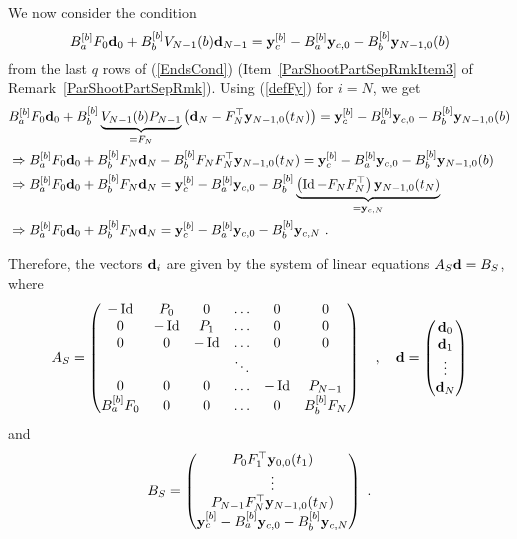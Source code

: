 We now consider the condition
\[
B_a^{[b]} F_0 \mathbf{d}_0 +B_b^{[b]} V_{N-1}(b) \mathbf{d}_{N-1}
= \mathbf{y}_c^{[b]} - B_a^{[b]} \mathbf{y}_{c,0} - B_b^{[b]} \mathbf{y}_{N-1,0}(b) 
\]
from the last $q$ rows of (\ref{EndsCond})
(Item~\ref{ParShootPartSepRmkItem3} of
Remark~\ref{ParShootPartSepRmk}).  Using (\ref{defFy}) for $i=N$, we
get
\begin{align*}
&B_a^{[b]} F_0 \mathbf{d}_0 +B_b^{[b]} \underbrace{V_{N-1}(b) P_{N-1}}_{=F_N} \left(
\mathbf{d}_N - F_N^\top\mathbf{y}_{N-1,0}(t_N)\right)
= \mathbf{y}_c^{[b]} - B_a^{[b]} \mathbf{y}_{c,0} - B_b^{[b]} \mathbf{y}_{N-1,0}(b) \\
&\Rightarrow
B_a^{[b]} F_0 \mathbf{d}_0 +B_b^{[b]} F_N \mathbf{d}_N
- B_b^{[b]} F_NF_N^\top \mathbf{y}_{N-1,0}(t_N)
= \mathbf{y}_c^{[b]} - B_a^{[b]} \mathbf{y}_{c,0} - B_b^{[b]} \mathbf{y}_{N-1,0}(b) \\
&\Rightarrow
B_a^{[b]} F_0 \mathbf{d}_0 +B_b^{[b]} F_N \mathbf{d}_N
= \mathbf{y}_c^{[b]} - B_a^{[b]} \mathbf{y}_{c,0} - B_b^{[b]}
\underbrace{\left( \operatorname{Id} - F_NF_N^\top \right)
\mathbf{y}_{N-1,0}(t_N)}_{= \mathbf{y}_{c,N}}  \\
&\Rightarrow
B_a^{[b]} F_0\mathbf{d}_0 + B_b^{[b]} F_N \mathbf{d}_N = \mathbf{y}_c^{[b]} -
B_a^{[b]} \mathbf{y}_{c,0} - B_b^{[b]} \mathbf{y}_{c,N}  \ .
\end{align*}

Therefore, the vectors $\mathbf{d}_i$ are given by the system of linear
equations $A_S \mathbf{d} = B_S$, where
\[
A_S = \begin{pmatrix}
-\operatorname{Id} & P_0 & 0 & \ldots & 0 & 0 \\
0 & -\operatorname{Id} & P_1 & \ldots & 0 & 0 \\
0 & 0 & -\operatorname{Id} & \ldots & 0 & 0 \\
 & & & \ddots & & \\
0 & 0 & 0 & \ldots & -\operatorname{Id} & P_{N-1} \\
B_a^{[b]} F_0 & 0 & 0 & \ldots & 0 & B_b^{[b]} F_N
\end{pmatrix}
\quad , \quad
\mathbf{d} = \begin{pmatrix} \mathbf{d}_0 \\ \mathbf{d}_1 \\ \vdots \\
\mathbf{d}_N \end{pmatrix}
\]
and
\[
B_S = \begin{pmatrix}
P_0 F_1^\top \mathbf{y}_{0,0}(t_1) \\
\vdots \\
P_{N-1} F_N^\top \mathbf{y}_{N-1,0}(t_N) \\
\mathbf{y}_{c}^{[b]} - B_a^{[b]} \mathbf{y}_{c,0} - B_b^{[b]} \mathbf{y}_{c,N}
\end{pmatrix} \ .
\]

